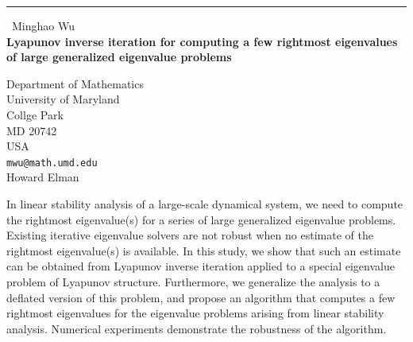 \documentclass{report}
\begin{document}
\begin{center}
\rule{6in}{1pt} \
{\large Minghao Wu \\
{\bf Lyapunov inverse iteration for computing a few rightmost eigenvalues of large generalized eigenvalue problems}}

Department of Mathematics \\ University of Maryland \\ Collge Park \\ MD 20742 \\ USA
\\
{\tt mwu@math.umd.edu}\\
Howard Elman\end{center}

In linear stability analysis of a large-scale dynamical system, we need
to compute the rightmost eigenvalue(s) for a series of large generalized
eigenvalue problems. Existing iterative eigenvalue solvers are not robust
when no estimate of the rightmost eigenvalue(s) is available. In this
study, we show that such an estimate can be obtained from Lyapunov
inverse iteration applied to a special eigenvalue problem of Lyapunov
structure. Furthermore, we generalize the analysis to a deflated version
of this problem, and propose an algorithm that computes a few rightmost
eigenvalues for the eigenvalue problems arising from linear stability
analysis. Numerical experiments demonstrate the robustness of the
algorithm.
\end{document}
